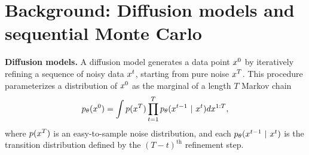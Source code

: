 \section{Background: Diffusion models and sequential Monte Carlo}\label{sec:background}



\textbf{Diffusion models.} 
A diffusion model generates a data point $x^{0}$ by iteratively refining a sequence of noisy data $x^{t}$, starting from pure noise $x^{T}$.
This procedure parameterizes a distribution of $x^{0}$ as the marginal of a length $T$ Markov chain
\vspace{-0.5em}
\begin{equation}\label{eqn:diffusion_marginal}
        p_{\theta}(x^{0})=\int p (x^{T}) \prod_{t=1}^T p_{\theta}(x^{t-1}  ~\vert~ x^{t})d x^{1:T},
\end{equation}
where $p(x^{T})$ is an easy-to-sample noise distribution,
and each $p_{\theta}(x^{t-1} ~\vert~ x^{t})$ is the transition distribution defined by the $(T-t)^\mathrm{th}$ refinement step. 

